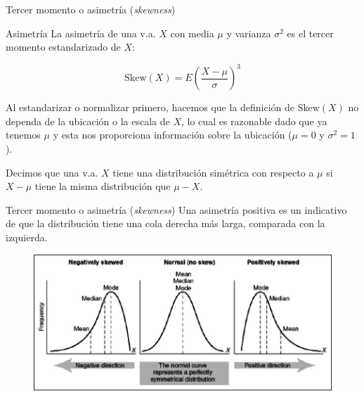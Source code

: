 \documentclass{beamer}
\begin{document}
\begin{frame}{Tercer momento o asimetría (\textit{skewness})}

  \begin{block}{Asimetría}
  La asimetría de una v.a. $X$ con media $\mu$ y varianza $\sigma^2$ es el tercer
momento estandarizado de $X$:

\begin{equation}
  \text{Skew}(X) = E(\frac{X-\mu}{\sigma})^3
\end{equation}

Al estandarizar o normalizar primero, hacemos que la definición de Skew$(X)$ no
dependa de la ubicación o la escala de $X$, lo cual es razonable dado que ya
tenemos $\mu$ y esta nos proporciona información sobre la ubicación ($\mu = 0$ y
$\sigma^2 = 1$).
\end{block}

\begin{block}{}
Decimos que una v.a. $X$ tiene una distribución simétrica con respecto a $\mu$
si $X-\mu$ tiene la misma distribución que $\mu-X$.
\end{block}


\end{frame}

\begin{frame}{Tercer momento o asimetría (\textit{skewness})}
Una asimetría positiva es un indicativo de que la distribución tiene una cola
derecha más larga, comparada con la izquierda. 

\begin{figure}[h!]
  \centering
  \includegraphics[scale=0.5]{figures/different_skewness.png}
\end{figure}

\end{frame}
\end{document}

